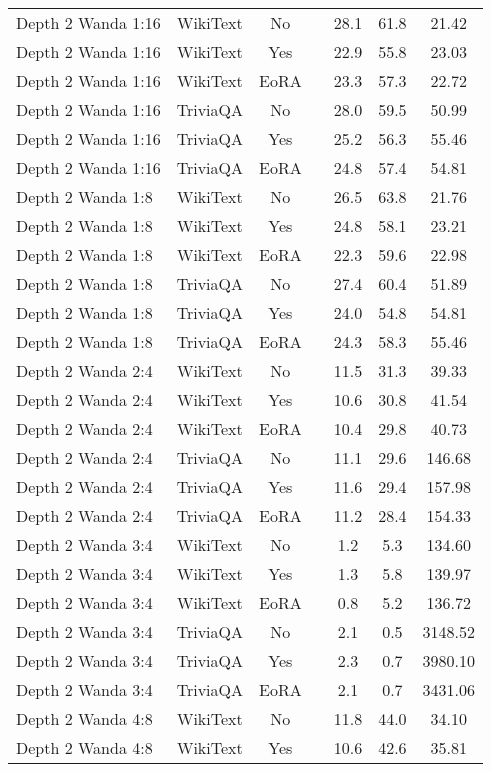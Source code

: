 \begin{longtable}{lcclccc}
Depth 2 Wanda 1:16 & WikiText & No & & 28.1 & 61.8 & 21.42 \\
Depth 2 Wanda 1:16 & WikiText & Yes & & 22.9 & 55.8 & 23.03 \\
Depth 2 Wanda 1:16 & WikiText & EoRA & & 23.3 & 57.3 & 22.72 \\
Depth 2 Wanda 1:16 & TriviaQA & No & & 28.0 & 59.5 & 50.99 \\
Depth 2 Wanda 1:16 & TriviaQA & Yes & & 25.2 & 56.3 & 55.46 \\
Depth 2 Wanda 1:16 & TriviaQA & EoRA & & 24.8 & 57.4 & 54.81 \\
Depth 2 Wanda 1:8 & WikiText & No & & 26.5 & 63.8 & 21.76 \\
Depth 2 Wanda 1:8 & WikiText & Yes & & 24.8 & 58.1 & 23.21 \\
Depth 2 Wanda 1:8 & WikiText & EoRA & & 22.3 & 59.6 & 22.98 \\
Depth 2 Wanda 1:8 & TriviaQA & No & & 27.4 & 60.4 & 51.89 \\
Depth 2 Wanda 1:8 & TriviaQA & Yes & & 24.0 & 54.8 & 54.81 \\
Depth 2 Wanda 1:8 & TriviaQA & EoRA & & 24.3 & 58.3 & 55.46 \\
Depth 2 Wanda 2:4 & WikiText & No & & 11.5 & 31.3 & 39.33 \\
Depth 2 Wanda 2:4 & WikiText & Yes & & 10.6 & 30.8 & 41.54 \\
Depth 2 Wanda 2:4 & WikiText & EoRA & & 10.4 & 29.8 & 40.73 \\
Depth 2 Wanda 2:4 & TriviaQA & No & & 11.1 & 29.6 & 146.68 \\
Depth 2 Wanda 2:4 & TriviaQA & Yes & & 11.6 & 29.4 & 157.98 \\
Depth 2 Wanda 2:4 & TriviaQA & EoRA & & 11.2 & 28.4 & 154.33 \\
Depth 2 Wanda 3:4 & WikiText & No & & 1.2 & 5.3 & 134.60 \\
Depth 2 Wanda 3:4 & WikiText & Yes & & 1.3 & 5.8 & 139.97 \\
Depth 2 Wanda 3:4 & WikiText & EoRA & & 0.8 & 5.2 & 136.72 \\
Depth 2 Wanda 3:4 & TriviaQA & No & & 2.1 & 0.5 & 3148.52 \\
Depth 2 Wanda 3:4 & TriviaQA & Yes & & 2.3 & 0.7 & 3980.10 \\
Depth 2 Wanda 3:4 & TriviaQA & EoRA & & 2.1 & 0.7 & 3431.06 \\
Depth 2 Wanda 4:8 & WikiText & No & & 11.8 & 44.0 & 34.10 \\
Depth 2 Wanda 4:8 & WikiText & Yes & & 10.6 & 42.6 & 35.81 \\

\end{longtable}
